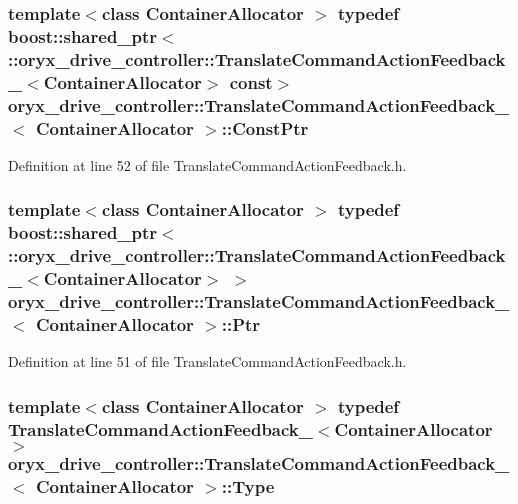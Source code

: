 \subsubsection[{\-Const\-Ptr}]{\setlength{\rightskip}{0pt plus 5cm}template$<$class Container\-Allocator $>$ typedef boost\-::shared\-\_\-ptr$<$ \-::{\bf oryx\-\_\-drive\-\_\-controller\-::\-Translate\-Command\-Action\-Feedback\-\_\-}$<$\-Container\-Allocator$>$ const$>$ {\bf oryx\-\_\-drive\-\_\-controller\-::\-Translate\-Command\-Action\-Feedback\-\_\-}$<$ \-Container\-Allocator $>$\-::{\bf \-Const\-Ptr}}\label{structoryx__drive__controller_1_1TranslateCommandActionFeedback___ad1c7562c3469d2d7b7b920486541e1cf}


\-Definition at line 52 of file \-Translate\-Command\-Action\-Feedback.\-h.

\subsubsection[{\-Ptr}]{\setlength{\rightskip}{0pt plus 5cm}template$<$class Container\-Allocator $>$ typedef boost\-::shared\-\_\-ptr$<$ \-::{\bf oryx\-\_\-drive\-\_\-controller\-::\-Translate\-Command\-Action\-Feedback\-\_\-}$<$\-Container\-Allocator$>$ $>$ {\bf oryx\-\_\-drive\-\_\-controller\-::\-Translate\-Command\-Action\-Feedback\-\_\-}$<$ \-Container\-Allocator $>$\-::{\bf \-Ptr}}\label{structoryx__drive__controller_1_1TranslateCommandActionFeedback___aa2cffbb22c4b69177a269f93514cc866}


\-Definition at line 51 of file \-Translate\-Command\-Action\-Feedback.\-h.

\subsubsection[{\-Type}]{\setlength{\rightskip}{0pt plus 5cm}template$<$class Container\-Allocator $>$ typedef {\bf \-Translate\-Command\-Action\-Feedback\-\_\-}$<$\-Container\-Allocator$>$ {\bf oryx\-\_\-drive\-\_\-controller\-::\-Translate\-Command\-Action\-Feedback\-\_\-}$<$ \-Container\-Allocator $>$\-::{\bf \-Type}}\label{structoryx__drive__controller_1_1TranslateCommandActionFeedback___a9af4a342a005807f4c1dd2b461f8c0c6}


